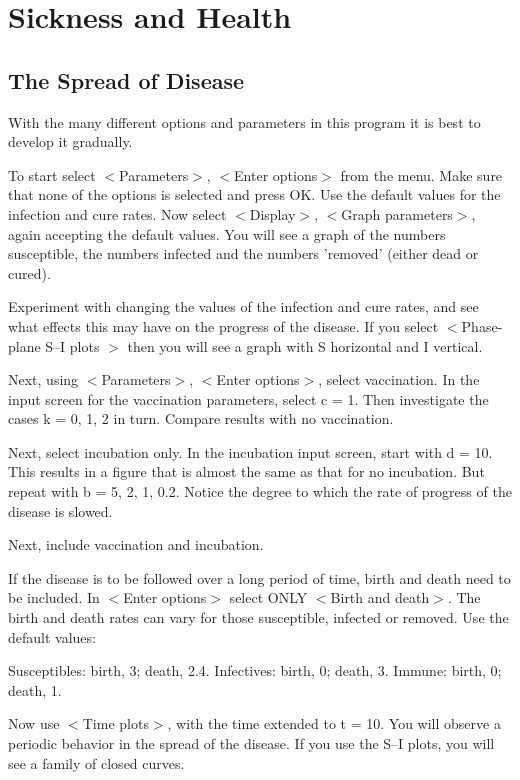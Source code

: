 \section{Sickness and Health}


\subsection{The Spread of Disease}

   With the many different options and parameters in this program
it is best to develop it gradually.

   To start select $<$Parameters$>$, $<$Enter options$>$ from the menu. Make
sure that none of the options is selected and press OK. Use the default
values for the infection and cure rates. Now select $<$Display$>$, $<$Graph
parameters$>$, again accepting the default values. You will see a graph
of the numbers susceptible, the numbers infected and the numbers
'removed' (either dead or cured).

   Experiment with changing the values of the infection and cure rates,
and see what effects this may have on the progress of the disease.
If you select $<$Phase-plane S--I plots $>$ then you will see a graph with
S horizontal and I vertical.

   Next, using $<$Parameters$>$, $<$Enter options$>$, select vaccination. In
the input screen for the vaccination parameters, select c = 1. Then
investigate the cases k = 0, 1, 2 in turn. Compare results with no
vaccination.

   Next, select incubation only. In the incubation input screen, start
with d = 10. This results in a figure that is almost the same as that
for no incubation. But repeat with b = 5, 2, 1, 0.2. Notice the degree
to which the rate of progress of the disease is slowed.

   Next, include vaccination and incubation.

   If the disease is to be followed over a long period of time, birth
and death need to be included. In $<$Enter options$>$ select ONLY $<$Birth
and death$>$. The birth and death rates can vary for those susceptible,
infected or removed. Use the default values:

      Susceptibles: birth, 3; death, 2.4.
      Infectives:   birth, 0; death, 3.
      Immune:       birth, 0; death, 1.

   Now use $<$Time plots$>$, with the time extended to t = 10. You will
observe a periodic behavior in the spread of the disease. If you use
the S--I plots, you will see a family of closed curves.


